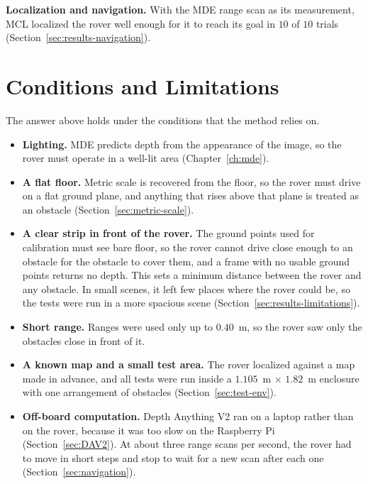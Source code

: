 \textbf{Localization and navigation.} With the MDE range scan as its measurement, MCL localized the
rover well enough for it to reach its goal in $10$ of $10$ trials
(Section~\ref{sec:results-navigation}).

\section{Conditions and Limitations}
\label{sec:conclusion-conditions}

The answer above holds under the conditions that the method relies on.
\begin{itemize}
  \item \textbf{Lighting.} MDE predicts depth from the appearance of the image, so the rover must
  operate in a well-lit area (Chapter~\ref{ch:mde}).

  \item \textbf{A flat floor.} Metric scale is recovered from the floor, so the rover must drive on
  a flat ground plane, and anything that rises above that plane is treated as an obstacle
  (Section~\ref{sec:metric-scale}).

  \item \textbf{A clear strip in front of the rover.} The ground points used for calibration must
  see bare floor, so the rover cannot drive close enough to an obstacle for the obstacle to cover
  them, and a frame with no usable ground points returns no depth. This sets a minimum distance
  between the rover and any obstacle. In small scenes, it left few places where the rover could
  be, so the tests were run in a more spacious scene (Section~\ref{sec:results-limitations}).

  \item \textbf{Short range.} Ranges were used only up to $0.40$~m, so the rover saw only the
  obstacles close in front of it.

  \item \textbf{A known map and a small test area.} The rover localized against a map made in
  advance, and all tests were run inside a $1.105$~m $\times$ $1.82$~m enclosure with one
  arrangement of obstacles (Section~\ref{sec:test-env}).

  \item \textbf{Off-board computation.} Depth Anything V2 ran on a laptop rather than on the rover,
  because it was too slow on the Raspberry Pi (Section~\ref{sec:DAV2}). At about three range scans
  per second, the rover had to move in short steps and stop to wait for a new scan after each one
  (Section~\ref{sec:navigation}).
\end{itemize}


